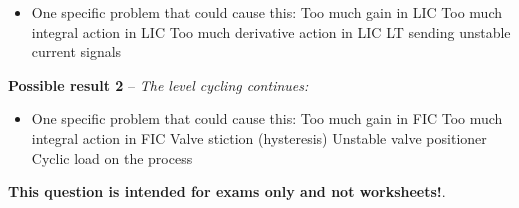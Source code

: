 \begin{itemize}
\item{} One specific problem that could cause this: 
\itemitem{} Too much gain in LIC
\itemitem{} Too much integral action in LIC
\itemitem{} Too much derivative action in LIC
\itemitem{} LT sending unstable current signals
\end{itemize}

\noindent
{\bf Possible result 2} -- {\it The level cycling continues:}

\begin{itemize}
\item{} One specific problem that could cause this:
\itemitem{} Too much gain in FIC
\itemitem{} Too much integral action in FIC
\itemitem{} Valve stiction (hysteresis)
\itemitem{} Unstable valve positioner
\itemitem{} Cyclic load on the process
\end{itemize}







{\bf This question is intended for exams only and not worksheets!}.




